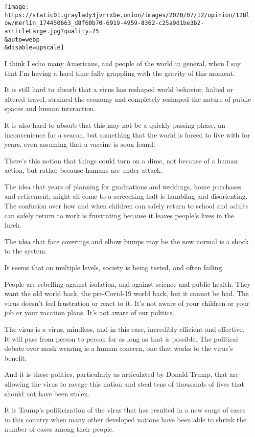 \texttt{[image: https://static01.graylady3jvrrxbe.onion/images/2020/07/12/opinion/12Blow/merlin\_174450663\_d8f60b70-6919-4959-8362-c25a9d1be3b2-articleLarge.jpg?quality=75\\\&auto=webp\\\&disable=upscale]}

I think I echo many Americans, and people of the world in general, when
I say that I'm having a hard time fully grappling with the gravity of
this moment.

It is still hard to absorb that a virus has reshaped world behavior,
halted or altered travel, strained the economy and completely reshaped
the nature of public spaces and human interaction.

It is also hard to absorb that this may not be a quickly passing phase,
an inconvenience for a season, but something that the world is forced to
live with for years, even assuming that a vaccine is soon found.

There's this notion that things could turn on a dime, not because of a
human action, but rather because humans are under attack.

The idea that years of planning for graduations and weddings, home
purchases and retirement, might all come to a screeching halt is
humbling and disorienting. The confusion over how and when children can
safely return to school and adults can safely return to work is
frustrating because it leaves people's lives in the lurch.

The idea that face coverings and elbow bumps may be the new normal is a
shock to the system.

It seems that on multiple levels, society is being tested, and often
failing.

People are rebelling against isolation, and against science and public
health. They want the old world back, the pre-Covid-19 world back, but
it cannot be had. The virus doesn't feel frustration or react to it.
It's not aware of your children or your job or your vacation plans. It's
not aware of our politics.

The virus is a virus, mindless, and in this case, incredibly efficient
and effective. It will pass from person to person for as long as that is
possible. The political debate over mask wearing is a human concern, one
that works to the virus's benefit.

And it is these politics, particularly as articulated by Donald Trump,
that are allowing the virus to ravage this nation and steal tens of
thousands of lives that should not have been stolen.

It is Trump's politicization of the virus that has resulted in a new
surge of cases in this country when many other developed nations have
been able to shrink the number of cases among their people.

